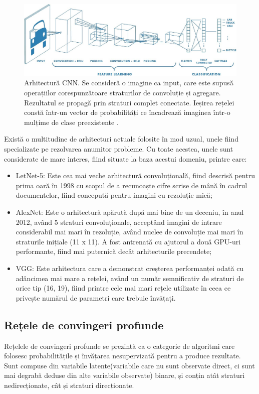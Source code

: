 \documentclass[a4paper,12pt]{report}
\begin{document}
\begin{figure}[h!]
    \centering
    \includegraphics[width=15cm]{..//resources//images//conv_cnn.jpeg} 
    \caption{Arhitectură CNN. Se consideră o imagine ca input, care este supusă operațiilor corespunzătoare straturilor
    de convoluție și agregare. Rezultatul se propagă prin straturi complet conectate. 
    Ieșirea rețelei constă într-un vector de probabilități ce încadrează imaginea într-o mulțime
    de clase preexistente \cite{WEBSITE:medium-raghav}.}
\end{figure}

Există o multitudine de arhitecturi actuale folosite în mod uzual, unele 
fiind specializate pe rezolvarea anumitor probleme. Cu toate acestea, unele
sunt considerate de mare interes, fiind situate la baza acestui domeniu,
printre care:
\begin{itemize}
    \item LetNet-5: Este cea mai veche arhitectură convoluțională, fiind descrisă pentru prima oară 
    în 1998 cu scopul de a recunoaște cifre scrise de mână în cadrul documentelor, fiind concepută 
    pentru imagini cu rezoluție mică;
    \item AlexNet: Este o arhitectură 
    apărută după mai bine de un deceniu, în anul 2012, având 5 straturi convoluționale, acceptând 
    imagini de intrare considerabil mai mari în rezoluție, având nuclee de convoluție mai mari 
    în straturile inițiale (11 x 11). A fost antrenată cu ajutorul a două GPU-uri performante,
    fiind mai puternică decât arhitecturile precendete;
    \item VGG: Este arhitectura care a demonstrat creșterea performanței odată cu adâncimea mai 
    mare a rețelei, având un număr semnificativ de straturi de orice tip (16, 19), fiind printre 
    cele mai mari rețele utilizate în ceea ce privește numărul 
    de parametri care trebuie învățați.
\end{itemize}
\newpage
\subsection{Rețele de convingeri profunde}
Rețelele de convingeri profunde se prezintă ca o categorie de algoritmi care folosesc 
probabilitățile și învățarea nesupervizată pentru a produce rezultate. Sunt compuse 
din variabile latente(variabile care nu sunt observate direct, 
ci sunt mai degrabă deduse din alte variabile observate) binare, și conțin
atât straturi nedirecționate, cât și straturi direcționate.
\end{document}
